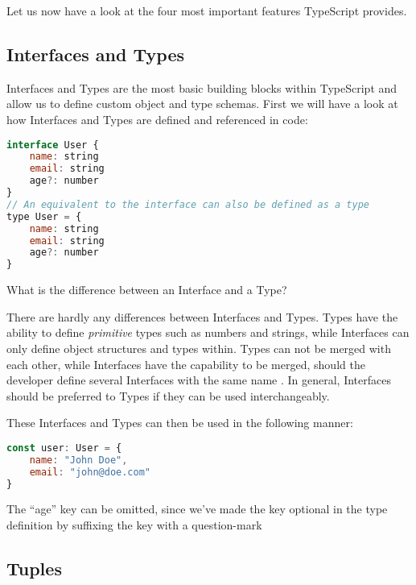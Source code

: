 \documentclass[english,runningheads, letterpaper]{llncs}[2018/03/10]
\begin{document}
Let us now have a look at the four most important features TypeScript
provides.

\subsection{Interfaces and Types}

Interfaces and Types are the most basic building blocks within TypeScript
and allow us to define custom object and type schemas. First we will
have a look at how Interfaces and Types are defined and referenced
in code:

\begin{lstlisting}[style=ES6, language=JavaScript, caption="Interface and Type declarations"]
interface User {
	name: string
	email: string
	age?: number
}
// An equivalent to the interface can also be defined as a type
type User = {
	name: string
	email: string
	age?: number
}
\end{lstlisting}

\begin{question}
What is the difference between an Interface and a Type?
\end{question}

\begin{solution}
There are hardly any differences between Interfaces and Types. Types
have the ability to define \textit{primitive} types such as numbers and strings,
while Interfaces can only define object structures and types within.
Types can not be merged with each other, while Interfaces have the
capability to be merged, should the developer define several Interfaces
with the same name \cite{ref_ts_interfaces_vs_types}. In general, Interfaces should be preferred to
Types if they can be used interchangeably.
\end{solution}

These Interfaces and Types can then be used in the following manner:

\begin{lstlisting}[style=ES6, language=JavaScript, caption="Interface and Type usage"]
const user: User = {
	name: "John Doe",
	email: "john@doe.com"
}
\end{lstlisting}

\begin{note}
The ``age'' key can be omitted, since we've made the key optional
in the type definition by suffixing the key with a question-mark
\end{note}


\subsection{Tuples}
\end{document}
